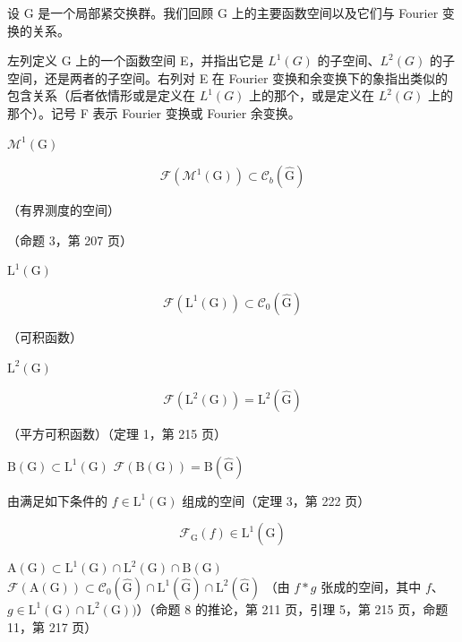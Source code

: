 
设 G 是一个局部紧交换群。我们回顾 G 上的主要函数空间以及它们与 Fourier 变换的关系。

左列定义 G 上的一个函数空间 E，并指出它是 \(L^{1}(G)\) 的子空间、\(L^{2}(G)\) 的子空间，还是两者的子空间。右列对 E 在 Fourier 变换和余变换下的象指出类似的包含关系（后者依情形或是定义在 \(L^{1}(G)\) 上的那个，或是定义在 \(L^{2}(G)\) 上的那个）。记号 F 表示 Fourier 变换或 Fourier 余变换。

\(\mathcal{M}^1 (\mathrm{G})\)

\[
\mathcal {F} (\mathcal {M} ^ {1} (\mathrm{G})) \subset \mathcal {C} _ {b} (\widehat {\mathrm{G}})
\]

（有界测度的空间）

（命题 3，第 207 页）

\(\mathrm{L}^{1}(\mathrm{G})\)

\[
\mathcal {F} (\mathrm{L} ^ {1} (\mathrm{G})) \subset \mathcal {C} _ {0} (\widehat {\mathrm{G}})
\]

（可积函数）

\(\mathrm{L}^2 (\mathrm{G})\)

\[
\mathscr {F} (\mathrm{L} ^ {2} (\mathrm{G})) = \mathrm{L} ^ {2} (\widehat {\mathrm{G}})
\]

（平方可积函数）（定理 1，第 215 页）

\(\mathrm{B(G)}\subset \mathrm{L}^{1}(\mathrm{G})\) \(\mathcal{F}(\mathrm{B(G)}) = \mathrm{B}(\widehat{\mathrm{G}})\)

由满足如下条件的 \(f \in \mathrm{L}^1(\mathrm{G})\) 组成的空间（定理 3，第 222 页）

\[
\mathcal {F} _ {\mathrm{G}} (f) \in \mathrm{L} ^ {1} (\widehat {\mathrm{G}})
\]

\(\mathrm{A(G)}\subset \mathrm{L}^1 (\mathrm{G})\cap \mathrm{L}^2 (\mathrm{G})\cap \mathrm{B(G)}\) \(\mathcal{F}(\mathrm{A(G)})\subset \mathcal{C}_0(\widehat{\mathrm{G}})\cap \mathrm{L}^1 (\widehat{\mathrm{G}})\cap \mathrm{L}^2 (\widehat{\mathrm{G}})\) （由 \(f*g\) 张成的空间，其中 \(f\)、\(g\in \mathrm{L}^{1}(\mathrm{G})\cap \mathrm{L}^{2}(\mathrm{G}))\)）（命题 8 的推论，第 211 页，引理 5，第 215 页，命题 11，第 217 页）

